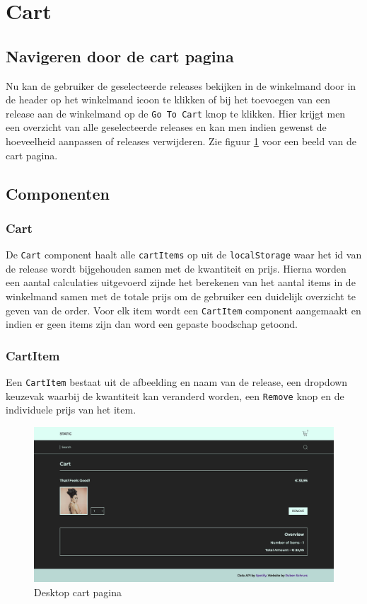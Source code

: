 \section{Cart}

\subsection{Navigeren door de cart pagina}

Nu kan de gebruiker de geselecteerde releases bekijken in de winkelmand door in de header op het winkelmand icoon te klikken of bij het toevoegen van een release aan de winkelmand op de \texttt{Go To Cart} knop te klikken. Hier krijgt men een overzicht van alle geselecteerde releases en kan men indien gewenst de hoeveelheid aanpassen of releases verwijderen. Zie figuur \ref{fig:desktopCart} voor een beeld van de cart pagina.

\subsection{Componenten}

\subsubsection{Cart}

De \texttt{Cart} component haalt alle \texttt{cartItems} op uit de \texttt{localStorage} waar het id van de release wordt bijgehouden samen met de kwantiteit en prijs. Hierna worden een aantal calculaties uitgevoerd zijnde het berekenen van het aantal items in de winkelmand samen met de totale prijs om de gebruiker een duidelijk overzicht te geven van de order. Voor elk item wordt een \texttt{CartItem} component aangemaakt en indien er geen items zijn dan word een gepaste boodschap getoond.

\subsubsection{CartItem}

Een \texttt{CartItem} bestaat uit de afbeelding en naam van de release, een dropdown keuzevak waarbij de kwantiteit kan veranderd worden, een \texttt{Remove} knop en de individuele prijs van het item.

\begin{figure}
	\centering
	\includegraphics[width=1\linewidth]{graphics/desktopCart}
	\caption[Desktop cart pagina]{Desktop cart pagina}
	\label{fig:desktopCart}
\end{figure}

